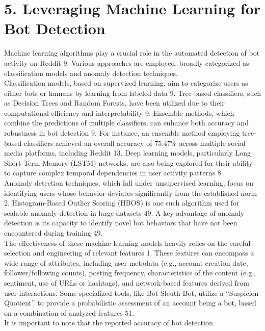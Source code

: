\documentclass[
  12pt,
  letterpaper,
  DIV=11,
  numbers=noendperiod]{scrartcl}
\begin{document}
\section{\texorpdfstring{\textbf{5. Leveraging Machine Learning for Bot
Detection}}{5. Leveraging Machine Learning for Bot Detection}}\label{leveraging-machine-learning-for-bot-detection}

Machine learning algorithms play a crucial role in the automated
detection of bot activity on Reddit 9. Various approaches are employed,
broadly categorized as classification models and anomaly detection
techniques.\\
Classification models, based on supervised learning, aim to categorize
users as either bots or humans by learning from labeled data 9.
Tree-based classifiers, such as Decision Trees and Random Forests, have
been utilized due to their computational efficiency and interpretability
9. Ensemble methods, which combine the predictions of multiple
classifiers, can enhance both accuracy and robustness in bot detection
9. For instance, an ensemble method employing tree-based classifiers
achieved an overall accuracy of 75.47\% across multiple social media
platforms, including Reddit 13. Deep learning models, particularly Long
Short-Term Memory (LSTM) networks, are also being explored for their
ability to capture complex temporal dependencies in user activity
patterns 8.\\
Anomaly detection techniques, which fall under unsupervised learning,
focus on identifying users whose behavior deviates significantly from
the established norm 2. Histogram-Based Outlier Scoring (HBOS) is one
such algorithm used for scalable anomaly detection in large datasets 49.
A key advantage of anomaly detection is its capacity to identify novel
bot behaviors that have not been encountered during training 49.\\
The effectiveness of these machine learning models heavily relies on the
careful selection and engineering of relevant features 1. These features
can encompass a wide range of attributes, including user metadata (e.g.,
account creation date, follower/following counts), posting frequency,
characteristics of the content (e.g., sentiment, use of URLs or
hashtags), and network-based features derived from user interactions.
Some specialized tools, like Bot-Sleuth-Bot, utilize a ``Suspicion
Quotient'' to provide a probabilistic assessment of an account being a
bot, based on a combination of analyzed features 51.\\
It is important to note that the reported accuracy of bot detection
\end{document}
